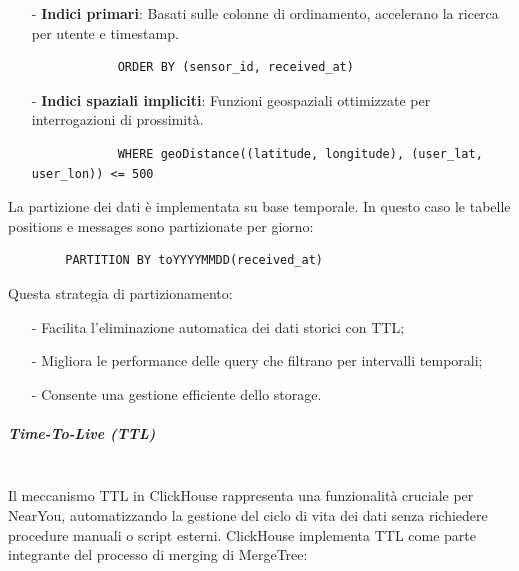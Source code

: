 \documentclass[10pt]{article}
\newcommand{\mysubparagraph}[1]{\subparagraph{#1}\mbox{}\\}
\begin{document}
        \begin{itemize}
            \item[-] \textbf{Indici primari}: Basati sulle colonne di ordinamento, accelerano la ricerca per utente e timestamp.
            \begin{lstlisting}
            ORDER BY (sensor_id, received_at)
            \end{lstlisting}

            \item[-] \textbf{Indici spaziali impliciti}: Funzioni geospaziali ottimizzate per interrogazioni di prossimità.
            \begin{lstlisting}
            WHERE geoDistance((latitude, longitude), (user_lat, user_lon)) <= 500
            \end{lstlisting}
        \end{itemize}

        La partizione dei dati è implementata su base temporale. In questo caso le tabelle positions e messages sono partizionate per giorno:
        \begin{lstlisting}
        PARTITION BY toYYYYMMDD(received_at)
        \end{lstlisting}

            Questa strategia di partizionamento:
            \begin{itemize}
                \item[-] Facilita l'eliminazione automatica dei dati storici con TTL;
                \item[-] Migliora le performance delle query che filtrano per intervalli temporali;
                \item[-] Consente una gestione efficiente dello storage.
            \end{itemize}

        \mysubparagraph{Time-To-Live (TTL)}
        Il meccanismo TTL in ClickHouse rappresenta una funzionalità cruciale per NearYou, automatizzando la gestione del ciclo di vita dei dati senza richiedere procedure manuali o script esterni. ClickHouse implementa TTL come parte integrante del processo di merging di MergeTree:
\end{document}
